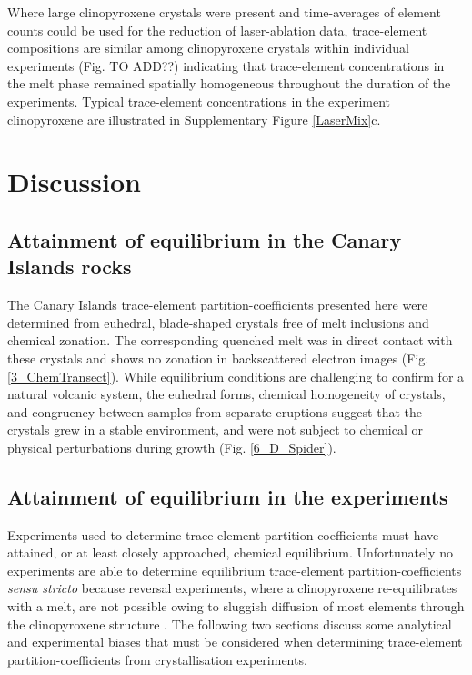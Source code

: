 \documentclass[review,authoryear,12pt]{elsarticle}
\begin{document}
Where large clinopyroxene crystals were present and time-averages of element counts could be used for the reduction of laser-ablation data, trace-element compositions are similar among clinopyroxene crystals within individual experiments (Fig. TO ADD??) indicating that trace-element concentrations in the melt phase remained spatially homogeneous throughout the duration of the experiments. Typical trace-element concentrations in the experiment clinopyroxene are illustrated in Supplementary Figure \ref{LaserMix}c.

	

\section{Discussion}
\subsection{Attainment of equilibrium in the Canary Islands rocks}
The Canary Islands trace-element partition-coefficients presented here were determined from euhedral, blade-shaped crystals free of melt inclusions and chemical zonation. The corresponding quenched melt was in direct contact with these crystals and shows no zonation in backscattered electron images (Fig. \ref{3_ChemTransect}). While equilibrium conditions are challenging to confirm for a natural volcanic system, the euhedral forms, chemical homogeneity of crystals, and congruency between samples from separate eruptions suggest that the crystals grew in a stable environment, and were not subject to chemical or physical perturbations during growth (Fig. \ref{6_D_Spider}).	

\subsection{Attainment of equilibrium in the experiments}
Experiments used to determine trace-element-partition coefficients must have attained, or at least closely approached, chemical equilibrium. Unfortunately no experiments are able to determine equilibrium trace-element partition-coefficients \emph{sensu stricto} because reversal experiments, where a clinopyroxene re-equilibrates with a melt, are not possible owing to sluggish diffusion of most elements through the clinopyroxene structure \citep{VanOrman2001,Zhang2010}.
     The following two sections discuss some analytical and experimental biases that must be considered when determining trace-element partition-coefficients from crystallisation experiments.
\end{document}
